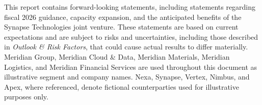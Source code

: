 \documentclass[11pt,oneside,a4paper]{scrbook}
\begin{document}
{\footnotesize\color{merSlate}
This report contains forward-looking statements, including statements regarding fiscal 2026 guidance, capacity expansion, and the anticipated benefits of the Synapse Technologies joint venture. These statements are based on current expectations and are subject to risks and uncertainties, including those described in \textit{Outlook \& Risk Factors}, that could cause actual results to differ materially. Meridian Group, Meridian Cloud \& Data, Meridian Materials, Meridian Logistics, and Meridian Financial Services are used throughout this document as illustrative segment and company names. Nexa, Synapse, Vertex, Nimbus, and Apex, where referenced, denote fictional counterparties used for illustrative purposes only.}
\end{document}

